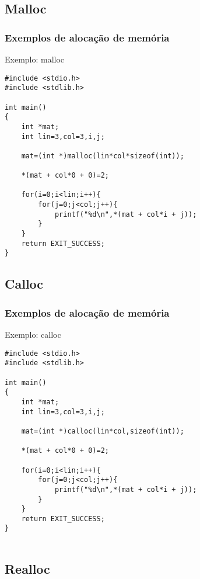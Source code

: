 \subsection{Malloc}


\begin{frame}[fragile]
  \frametitle{Exemplos de alocação de memória}
  

  \begin{block}{Exemplo: malloc}
  \begin{lstlisting}
#include <stdio.h>
#include <stdlib.h>

int main()
{
    int *mat;
    int lin=3,col=3,i,j;

    mat=(int *)malloc(lin*col*sizeof(int));

    *(mat + col*0 + 0)=2;

    for(i=0;i<lin;i++){
        for(j=0;j<col;j++){
            printf("%d\n",*(mat + col*i + j));
        }
    }
    return EXIT_SUCCESS;
}

  \end{lstlisting}
  \end{block}
\end{frame}

\subsection{Calloc}


\begin{frame}[fragile]
  \frametitle{Exemplos de alocação de memória}
  

  \begin{block}{Exemplo: calloc}
  \begin{lstlisting}
#include <stdio.h>
#include <stdlib.h>

int main()
{
    int *mat;
    int lin=3,col=3,i,j;

    mat=(int *)calloc(lin*col,sizeof(int));

    *(mat + col*0 + 0)=2;

    for(i=0;i<lin;i++){
        for(j=0;j<col;j++){
            printf("%d\n",*(mat + col*i + j));
        }
    }
    return EXIT_SUCCESS;
}


  \end{lstlisting}
  \end{block}
\end{frame}
\subsection{Realloc}

